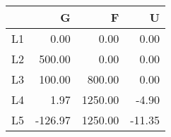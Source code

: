 \begin{table}[ht]
\centering
\begin{tabular}{rrrr}
  \hline
 & G & F & U \\ 
  \hline
L1 & 0.00 & 0.00 & 0.00 \\ 
  L2 & 500.00 & 0.00 & 0.00 \\ 
  L3 & 100.00 & 800.00 & 0.00 \\ 
  L4 & 1.97 & 1250.00 & -4.90 \\ 
  L5 & -126.97 & 1250.00 & -11.35 \\ 
   \hline
\end{tabular}
\end{table}
